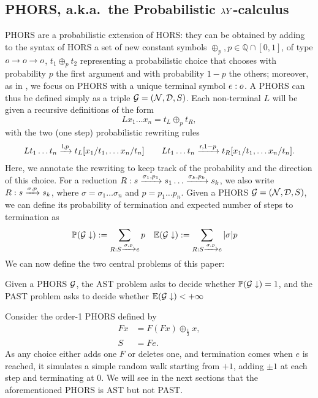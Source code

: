 \subsection{PHORS, a.k.a.~the Probabilistic $\lambda Y$-calculus}
PHORS are a probabilistic extension of HORS: they can be obtained by adding to the syntax of HORS a set of new constant symbols $\oplus_p, p \in \mathbb{Q}\cap[0,1]$, of type $o \to o \to o$, $t_1 \oplus_p t_2$ representing a probabilistic choice that chooses with probability $p$ the first argument and with probability $1-p$ the others; moreover, as in \cite{DBLP:journals/lmcs/KobayashiLG20}, we focus on PHORS with a unique terminal symbol $e:o$. A PHORS can thus be defined simply as a triple $\mathcal{G}=(\mathcal{N}, \mathcal{D}, S)$. Each non-terminal $L$ will be given a recursive definitions of the form 
\[L x_1 \dots x_n = t_L \oplus_p t_R,\]
with the two (one step) probabilistic rewriting rules
\begin{align*} 
L t_1 \dots t_n  \xrightarrow{\mathsf l,p} t_L[x_1/t_1, \dots x_n/t_n] \qquad
L t_1 \dots t_n \xrightarrow{\mathsf r,1-p} t_R[x_1/t_1, \dots x_n/t_n].
\end{align*}
 Here, we annotate the rewriting to keep track of the probability and the direction of this choice. For a reduction $R: s \xrightarrow{\sigma_1 ,p_1} s_1 \dots  \xrightarrow{\sigma_k ,p_k} s_k$, we also write $R:s \xrightarrow{\sigma,p} s_k$, where
 $\sigma = \sigma_1 \dots \sigma_n$ and $p = p_1\dots p_n$.%
 Given a PHORS $\mathcal{G}=(\mathcal{N}, \mathcal{D},S)$, we can define its probability of termination
 and expected number of steps to termination as
 \begin{align*}
 \mathbb{P}({\mathcal{G}} \downarrow)&:= \sum_{R:S \xrightarrow{\sigma, p} e} p &
 \mathbb{E}({\mathcal{G}} \downarrow)&:=  \sum_{R:S \xrightarrow{\sigma, p} e} |\sigma |p
 \end{align*}
We can now define the two central problems of this paper:
\begin{definition}
	Given a PHORS $\mathcal{G}$, the AST problem asks to decide whether $\mathbb{P}({\mathcal{G}} \downarrow)=1$, and the PAST problem asks to decide  whether $\mathbb{E}({\mathcal{G}} \downarrow) < + \infty$
\end{definition}

\begin{example}\label{ex:phors0}
Consider the order-1 PHORS defined by
\begin{align*}
Fx&= F(Fx)\oplus_{\frac{1}{2}} x,\\
S&= Fe.
\end{align*}
As any choice either adds one $F$ or deletes one, and termination comes when $e$ is reached, it simulates a simple random walk starting from $+1$, adding $\pm 1$ at each step and terminating at $0$. We will see in the next sections that the aforementioned PHORS is AST but not PAST. 
\end{example}


